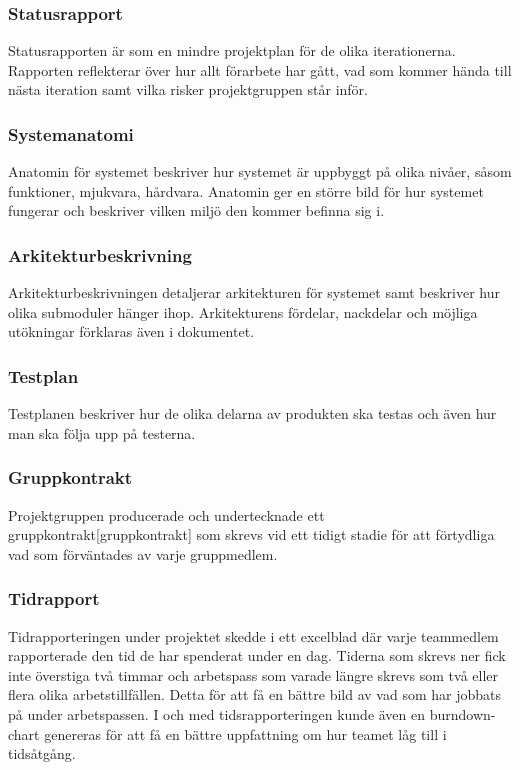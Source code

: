 \subsubsection*{Statusrapport}
Statusrapporten är som en mindre projektplan för
de olika iterationerna. Rapporten reflekterar över hur allt förarbete har gått, vad som kommer
hända till nästa iteration samt vilka risker projektgruppen står inför.

\subsubsection*{Systemanatomi}
Anatomin för systemet beskriver hur systemet är uppbyggt på olika nivåer, såsom funktioner, mjukvara, hårdvara. Anatomin ger en större bild för hur systemet fungerar och beskriver vilken miljö den kommer befinna sig i.

\subsubsection*{Arkitekturbeskrivning}
Arkitekturbeskrivningen detaljerar arkitekturen för systemet samt beskriver hur olika submoduler hänger ihop. Arkitekturens fördelar, nackdelar och möjliga utökningar förklaras även i dokumentet.

\subsubsection*{Testplan}
Testplanen beskriver hur de olika delarna av produkten ska testas och även hur man ska följa upp på testerna.

\subsubsection*{Gruppkontrakt}
Projektgruppen producerade och undertecknade ett gruppkontrakt[gruppkontrakt] som skrevs vid ett tidigt stadie för att förtydliga vad som förväntades av varje gruppmedlem.

\subsubsection*{Tidrapport}
Tidrapporteringen under projektet skedde i ett excelblad där varje teammedlem rapporterade den tid de har spenderat under en dag. Tiderna som skrevs ner fick inte överstiga två timmar och arbetspass som varade längre skrevs som två eller flera olika arbetstillfällen. Detta för att få en bättre bild av vad som har jobbats på under arbetspassen. I och med tidsrapporteringen kunde även en burndown-chart genereras för att få en bättre uppfattning om hur teamet låg till i tidsåtgång.

